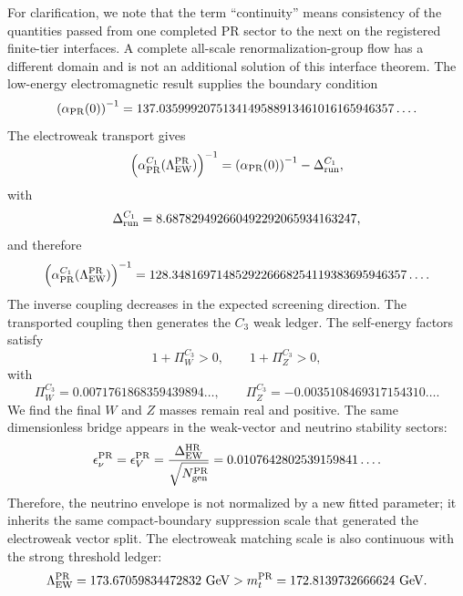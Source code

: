 \documentclass[11pt]{article}
\begin{document}
For clarification, we note that the term ``continuity'' means consistency of the quantities passed from one completed PR sector to the next on the registered finite-tier interfaces.  A complete all-scale renormalization-group flow has a different domain and is not an additional solution of this interface theorem.  The low-energy electromagnetic result supplies the boundary condition
\begin{equation}
\left(\alpha_{\rm PR}(0)\right)^{-1}
=
137.0359992075134149588913461016165946357\ldots .
\end{equation}
The electroweak transport gives
\begin{equation}
\left(\alpha_{\rm PR}^{C_1}
(\Lambda_{\rm EW}^{\rm PR})\right)^{-1}
=
\left(\alpha_{\rm PR}(0)\right)^{-1}
-
\Delta_{\rm run}^{C_1},
\end{equation}
with
\begin{equation}
\Delta_{\rm run}^{C_1}
=
8.687829492660492292065934163247,
\end{equation}
and therefore
\begin{equation}
\left(\alpha_{\rm PR}^{C_1}
(\Lambda_{\rm EW}^{\rm PR})\right)^{-1}
=
128.3481697148529226668254119383695946357\ldots .
\end{equation}
The inverse coupling decreases in the expected screening direction. The transported coupling then generates the \(C_3\) weak ledger.  The self-energy factors satisfy
\begin{equation}
1+\Pi_W^{C_3}>0,
\qquad
1+\Pi_Z^{C_3}>0,
\end{equation}
with
\begin{equation}
\Pi_W^{C_3}
=
0.0071761868359439894\ldots,
\qquad
\Pi_Z^{C_3}
=
-0.0035108469317154310\ldots .
\end{equation}
We find the final \(W\) and \(Z\) masses remain real and positive. The same dimensionless bridge appears in the weak-vector and neutrino stability sectors:
\begin{equation}
\epsilon_\nu^{\rm PR}
=
\epsilon_V^{\rm PR}
=
\frac{\Delta_{\rm EW}^{\rm HR}}
{\sqrt{N_{\rm gen}^{\rm PR}}}
=
0.0107642802539159841\ldots .
\label{eq:priii-shared-ew-neutrino-bridge}
\end{equation}
Therefore, the neutrino envelope is not normalized by a new fitted parameter; it inherits the same compact-boundary suppression scale that generated the electroweak vector split. The electroweak matching scale is also continuous with the strong threshold ledger:
\begin{equation}
\Lambda_{\rm EW}^{\rm PR}
=
173.67059834472832\ {\rm GeV}
>
m_t^{\rm PR}
=
172.8139732666624\ {\rm GeV}.
\end{equation}
\end{document}
